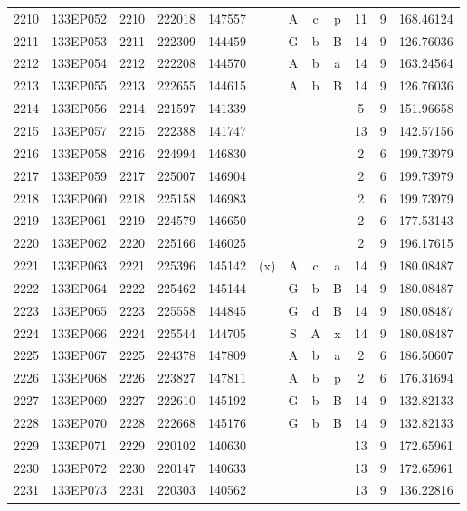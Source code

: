 \begin{tabular}{|*{12}{c|}}
2210 & 133EP052 & 2210 & 222018 & 147557 &  & A & c & p & 11 & 9 & 168.46124 \\ 
2211 & 133EP053 & 2211 & 222309 & 144459 &  & G & b & B & 14 & 9 & 126.76036 \\ 
2212 & 133EP054 & 2212 & 222208 & 144570 &  & A & b & a & 14 & 9 & 163.24564 \\ 
2213 & 133EP055 & 2213 & 222655 & 144615 &  & A & b & B & 14 & 9 & 126.76036 \\ 
2214 & 133EP056 & 2214 & 221597 & 141339 &  &  &  &  & 5 & 9 & 151.96658 \\ 
2215 & 133EP057 & 2215 & 222388 & 141747 &  &  &  &  & 13 & 9 & 142.57156 \\ 
2216 & 133EP058 & 2216 & 224994 & 146830 &  &  &  &  & 2 & 6 & 199.73979 \\ 
2217 & 133EP059 & 2217 & 225007 & 146904 &  &  &  &  & 2 & 6 & 199.73979 \\ 
2218 & 133EP060 & 2218 & 225158 & 146983 &  &  &  &  & 2 & 6 & 199.73979 \\ 
2219 & 133EP061 & 2219 & 224579 & 146650 &  &  &  &  & 2 & 6 & 177.53143 \\ 
2220 & 133EP062 & 2220 & 225166 & 146025 &  &  &  &  & 2 & 9 & 196.17615 \\ 
2221 & 133EP063 & 2221 & 225396 & 145142 & (x) & A & c & a & 14 & 9 & 180.08487 \\ 
2222 & 133EP064 & 2222 & 225462 & 145144 &  & G & b & B & 14 & 9 & 180.08487 \\ 
2223 & 133EP065 & 2223 & 225558 & 144845 &  & G & d & B & 14 & 9 & 180.08487 \\ 
2224 & 133EP066 & 2224 & 225544 & 144705 &  & S & A & x & 14 & 9 & 180.08487 \\ 
2225 & 133EP067 & 2225 & 224378 & 147809 &  & A & b & a & 2 & 6 & 186.50607 \\ 
2226 & 133EP068 & 2226 & 223827 & 147811 &  & A & b & p & 2 & 6 & 176.31694 \\ 
2227 & 133EP069 & 2227 & 222610 & 145192 &  & G & b & B & 14 & 9 & 132.82133 \\ 
2228 & 133EP070 & 2228 & 222668 & 145176 &  & G & b & B & 14 & 9 & 132.82133 \\ 
2229 & 133EP071 & 2229 & 220102 & 140630 &  &  &  &  & 13 & 9 & 172.65961 \\ 
2230 & 133EP072 & 2230 & 220147 & 140633 &  &  &  &  & 13 & 9 & 172.65961 \\ 
2231 & 133EP073 & 2231 & 220303 & 140562 &  &  &  &  & 13 & 9 & 136.22816 \\ 

\end{tabular}
